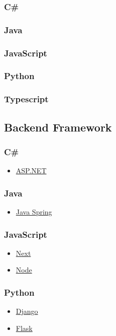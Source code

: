 \documentclass[a4paper, 12pt]{article}
\begin{document}
\subsubsection{C\#}
\subsubsection{Java}
\subsubsection{JavaScript}
\subsubsection{Python}
\subsubsection{Typescript}

\subsection{Backend Framework}
\subsubsection{C\#}
\begin{itemize}
    \item \href{https://dotnet.microsoft.com/en-us/apps/aspnet}{ASP.NET}
\end{itemize}
\subsubsection{Java}
\begin{itemize}
    \item \href{https://spring.io/}{Java Spring}
\end{itemize}
\subsubsection{JavaScript}
\begin{itemize}
    \item \href{https://nextjs.org/}{Next}
    \item \href{https://nodejs.org/}{Node}
\end{itemize}
\subsubsection{Python}
\begin{itemize}
    \item \href{https://www.djangoproject.com/}{Django}
    \item \href{https://flask.palletsprojects.com/}{Flask}
\end{itemize}
\end{document}
